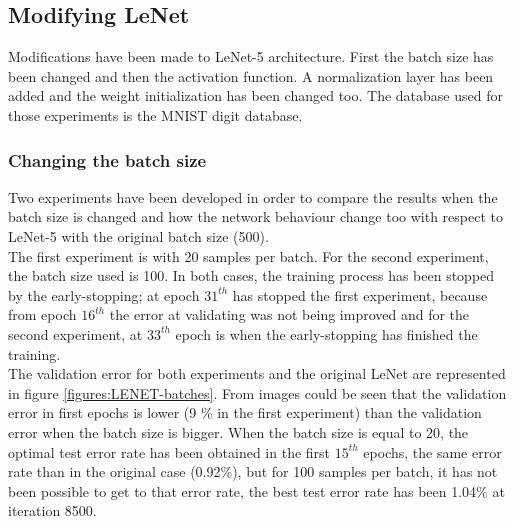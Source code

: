 \subsection{Modifying LeNet}
Modifications have been made to LeNet-5 architecture. First the batch size has been changed and then the activation function. A normalization layer has been added and the weight initialization has been changed too. The database used for those experiments is the MNIST digit database.

\subsubsection{Changing the batch size}
Two experiments have been developed in order to compare the results when the batch size is changed and how the network behaviour change too with respect to LeNet-5 with the original batch size (500).\\

The first experiment is with 20 samples per batch. For the second experiment, the batch size used is 100. In both cases, the training process has been stopped by the early-stopping; at epoch $31^{th}$ has stopped the first experiment, because from epoch $16^{th}$ the error at validating was not being improved and for the second experiment, at $33^{th}$ epoch is when the early-stopping has finished the training.\\

The validation error for both experiments and the original LeNet are represented in figure \ref{figures:LENET-batches}. From images could be seen that the validation error in first epochs is lower (9 \% in the first experiment) than the validation error when the batch size is bigger. When the batch size is equal to 20, the optimal test error rate has been obtained in the first $15^{th}$ epochs, the same error rate than in the original case (0.92\%), but for 100 samples per batch, it has not been possible to get to that error rate, the best test error rate has been 1.04\% at iteration 8500.\\

